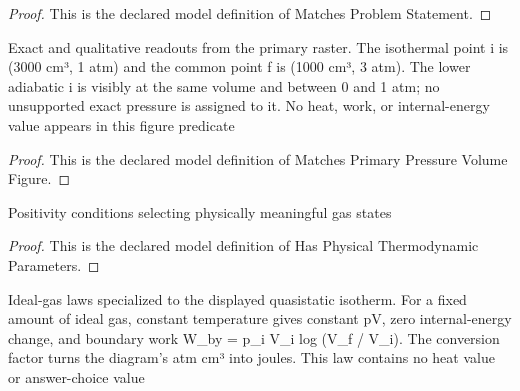 \begin{proof}
  This is the declared model definition of Matches Problem Statement.
\end{proof}
\begin{definition}
  \label{def:physics:phyx-mini-0410:phyxminiproblems-problemphyxmini0410-matchesprimarypressurevolumefigure}
  Exact and qualitative readouts from the primary raster. The isothermal point i is (3000 cm³, 1 atm) and the common point f is (1000 cm³, 3 atm). The lower adiabatic i is visibly at the same volume and between 0 and 1 atm; no unsupported exact pressure is assigned to it. No heat, work, or internal-energy value appears in this figure predicate
\end{definition}
\begin{proof}
  This is the declared model definition of Matches Primary Pressure Volume Figure.
\end{proof}
\begin{definition}
  \label{def:physics:phyx-mini-0410:phyxminiproblems-problemphyxmini0410-hasphysicalthermodynamicparameters}
  Positivity conditions selecting physically meaningful gas states
\end{definition}
\begin{proof}
  This is the declared model definition of Has Physical Thermodynamic Parameters.
\end{proof}
\begin{definition}
  \label{def:physics:phyx-mini-0410:phyxminiproblems-problemphyxmini0410-satisfiesidealgasisothermallaws}
  Ideal-gas laws specialized to the displayed quasistatic isotherm. For a fixed amount of ideal gas, constant temperature gives constant pV, zero internal-energy change, and boundary work W\_by = p\_i V\_i log (V\_f / V\_i). The conversion factor turns the diagram's atm cm³ into joules. This law contains no heat value or answer-choice value
\end{definition}
